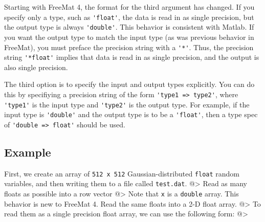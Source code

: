Starting with FreeMat 4, the format for the third argument has changed.
If you specify only a type, such as \verb|'float'|, the data is read in as
single precision, but the output type is always \verb|'double'|.  This behavior
is consistent with Matlab.  If you want the output type to match the input
type (as was previous behavior in FreeMat), you must preface the precision
string with a \verb|'*'|.  Thus, the precision string \verb|'*float'| implies
that data is read in as single precision, and the output is also single
precision.

The third option is to specify the input and output types explicitly.
You can do this by specifiying a precision string of the form 
\verb|'type1 => type2'|, where \verb|'type1'| is the input type and 
\verb|'type2'| is the output type.  For example, if the input type is
\verb|'double'| and the output type is to be a \verb|'float'|, then a type spec
of \verb|'double => float'| should be used.

\subsection{Example}

First, we create an array of \verb|512 x 512| Gaussian-distributed \verb|float| random variables, and then writing them to a file called \verb|test.dat|.
@>
Read as many floats as possible into a row vector
@>
Note that \verb|x| is a \verb|double| array.  This behavior is new to FreeMat 4.
Read the same floats into a 2-D float array.
@>
To read them as a single precision float array, we can use the
following form:
@>

